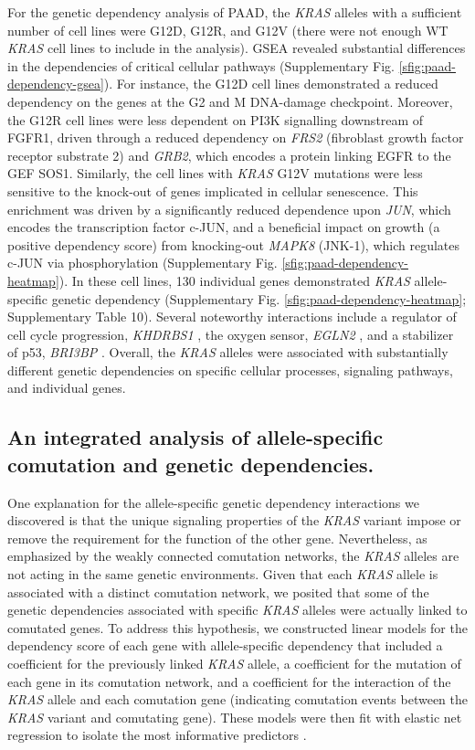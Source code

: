 \documentclass[english, 10pt, letterpaper]{article}
\newcommand{\KRAS}{\emph{KRAS}}
\begin{document}
For the genetic dependency analysis of PAAD, the \KRAS{} alleles with a sufficient number of cell lines were G12D, G12R, and G12V (there were not enough WT \KRAS{} cell lines to include in the analysis).
GSEA revealed substantial differences in the dependencies of critical cellular pathways (Supplementary Fig. \ref{sfig:paad-dependency-gsea}).
For instance, the G12D cell lines demonstrated a reduced dependency on the genes at the G2 and M DNA-damage checkpoint.
Moreover, the G12R cell lines were less dependent on PI3K signalling downstream of FGFR1, driven through a reduced dependency on \emph{FRS2} (fibroblast growth factor receptor substrate 2) and \emph{GRB2}, which encodes a protein linking EGFR to the GEF SOS1.
Similarly, the cell lines with \KRAS{} G12V mutations were less sensitive to the knock-out of genes implicated in cellular senescence.
This enrichment was driven by a significantly reduced dependence upon \emph{JUN}, which encodes the transcription factor c-JUN, and a beneficial impact on growth (a positive dependency score) from knocking-out \emph{MAPK8} (JNK-1), which regulates c-JUN via phosphorylation (Supplementary Fig. \ref{sfig:paad-dependency-heatmap}).
In these cell lines, 130 individual genes demonstrated \KRAS{} allele-specific genetic dependency (Supplementary Fig. \ref{sfig:paad-dependency-heatmap}; Supplementary Table 10).
Several noteworthy interactions include a regulator of cell cycle progression, \emph{KHDRBS1} \cite{Barlat1997ADomain}, the oxygen sensor, \emph{EGLN2} \cite{Ivan2017TheFeedbacks}, and a stabilizer of p53, \emph{BRI3BP} \cite{Ha2008HCCRBP-1Stabilization}.
Overall, the \KRAS{} alleles were associated with substantially different genetic dependencies on specific cellular processes, signaling pathways, and individual genes.


\subsection*{An integrated analysis of allele-specific comutation and genetic dependencies.}

One explanation for the allele-specific genetic dependency interactions we discovered is that the unique signaling properties of the \KRAS{} variant impose or remove the requirement for the function of the other gene. 
Nevertheless, as emphasized by the weakly connected comutation networks, the \KRAS{} alleles are not acting in the same genetic environments.
Given that each \KRAS{} allele is associated with a distinct comutation network, we posited that some of the genetic dependencies associated with specific \KRAS{} alleles were actually linked to comutated genes.
To address this hypothesis, we constructed linear models for the dependency score of each gene with allele-specific dependency that included a coefficient for the previously linked \KRAS{} allele, a coefficient for the mutation of each gene in its comutation network, and a coefficient for the interaction of the \KRAS{} allele and each comutation gene (indicating comutation events between the \KRAS{} variant and comutating gene).
These models were then fit with elastic net regression to isolate the most informative predictors \cite{Zou2005RegularizationNet}.
\end{document}
